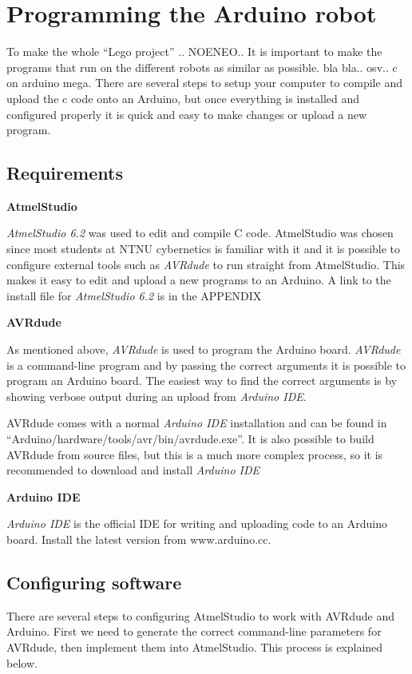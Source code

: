 \section{Programming the Arduino robot}
To make the whole ``Lego project'' .. NOENEO.. It is important to make the programs that run on the different robots as similar as possible. bla bla..  osv.. c on arduino mega. There are several steps to setup your computer to compile and upload the c code onto an Arduino, but once everything is installed and configured properly it is quick and easy to make changes or upload a new program.

\subsection{Requirements}
\textbf{AtmelStudio}

\textit{AtmelStudio 6.2} was used to edit and compile C code. AtmelStudio was chosen since most students at NTNU cybernetics is familiar with it and it is possible to configure external tools such as \textit{AVRdude} to run straight from AtmelStudio. This makes it easy to edit and upload a new programs to an Arduino. A link to the install file for \textit{AtmelStudio 6.2} is in the APPENDIX

\textbf{AVRdude}

As mentioned above, \textit{AVRdude} is used to program the Arduino board. \textit{AVRdude} is a command-line program and by passing the correct arguments it is possible to program an Arduino board. The easiest way to find the correct arguments is by showing verbose output during an upload from \textit{Arduino IDE}.

AVRdude comes with a normal \textit{Arduino IDE} installation and can be found in ``Arduino/hardware/tools/avr/bin/avrdude.exe''. It is also possible to build AVRdude from source files, but this is a much more complex process, so it is recommended to download and install \textit{Arduino IDE}

\textbf{Arduino IDE}

\textit{Arduino IDE} is the official IDE for writing and uploading code to an Arduino board. Install the latest version from www.arduino.cc.

\subsection{Configuring software}
There are several steps to configuring AtmelStudio to work with AVRdude and Arduino. First we need to generate the correct command-line parameters for AVRdude, then implement them into AtmelStudio. This process is explained below.

